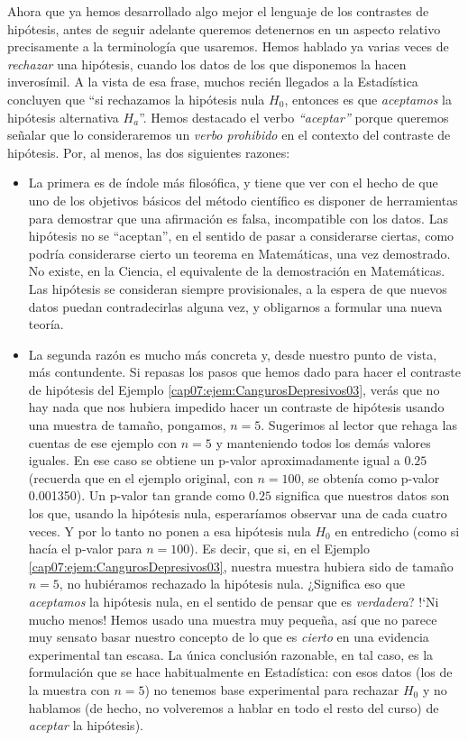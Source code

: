 Ahora que ya hemos desarrollado algo mejor el lenguaje de los contrastes de hipótesis, antes de seguir adelante queremos detenernos en un aspecto relativo precisamente a la terminología que usaremos. Hemos hablado ya varias veces de {\em rechazar} una hipótesis, cuando los datos de los que disponemos la hacen inverosímil. A la vista de esa frase, muchos recién llegados a la Estadística concluyen que ``si rechazamos la hipótesis nula $H_0$, entonces es que {\em aceptamos} la hipótesis alternativa $H_a$''. Hemos destacado el verbo {\em ``aceptar''} porque queremos señalar que lo consideraremos un {\em verbo prohibido} en el contexto del contraste de hipótesis. Por, al menos, las dos siguientes razones:
\begin{itemize}
  \item La primera es de índole más filosófica, y tiene que ver con el hecho de que uno de los objetivos básicos del método científico es disponer de herramientas para demostrar que una afirmación es falsa, incompatible con los datos. Las hipótesis no se ``aceptan'', en el sentido de pasar a considerarse ciertas, como podría considerarse cierto un teorema en Matemáticas, una vez demostrado. No existe, en la Ciencia, el equivalente de la demostración en Matemáticas. Las hipótesis se consideran siempre provisionales, a la espera de que nuevos datos puedan contradecirlas alguna vez, y obligarnos a formular una nueva teoría.
  \item La segunda razón es mucho más concreta y, desde nuestro punto de vista, más contundente. Si repasas los pasos que hemos dado para hacer el contraste de hipótesis del Ejemplo \ref{cap07:ejem:CangurosDepresivos03}, verás que no hay nada que nos hubiera impedido hacer un contraste de hipótesis usando una muestra de tamaño, pongamos,  $n=5$. Sugerimos al lector que rehaga las cuentas de ese ejemplo con $n=5$ y manteniendo todos los demás valores iguales. En ese caso se obtiene un p-valor aproximadamente igual a $0.25$ (recuerda que en el ejemplo original, con $n=100$, se obtenía como p-valor 0.001350). Un p-valor tan grande como $0.25$ significa que nuestros datos son los que, usando la hipótesis nula, esperaríamos observar una de cada cuatro veces. Y por lo tanto no ponen a esa hipótesis nula $H_0$ en entredicho (como si hacía el p-valor para $n=100$). Es decir, que si, en el Ejemplo \ref{cap07:ejem:CangurosDepresivos03}, nuestra muestra hubiera sido de tamaño $n=5$, no hubiéramos rechazado la hipótesis nula. ¿Significa eso que {\em aceptamos} la hipótesis nula, en el sentido de pensar que es {\em verdadera}? {!`}Ni mucho menos! Hemos usado una muestra muy pequeña, así que no parece muy sensato basar nuestro concepto de lo que es {\em cierto} en una evidencia experimental tan escasa. La única conclusión razonable, en tal caso, es la formulación que se hace habitualmente en Estadística: con esos datos (los de la muestra con $n=5$) no tenemos base experimental para rechazar $H_0$ y no hablamos (de hecho, no volveremos a hablar en todo el resto del curso) de {\em aceptar} la hipótesis).
\end{itemize}

